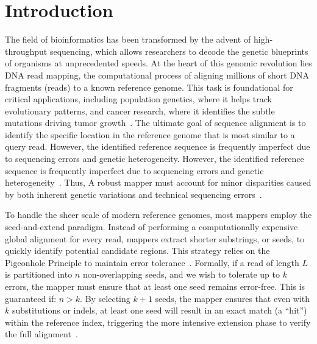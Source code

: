 \documentclass[unnumsec,webpdf,contemporary,large]{oup-authoring-template}%
\theoremstyle{thmstyleone}%
\theoremstyle{thmstyletwo}%
\theoremstyle{thmstylethree}%
\begin{document}


\section{Introduction}

The field of bioinformatics has been transformed by the advent of high-throughput sequencing,
which allows researchers to decode the genetic blueprints of organisms at unprecedented speeds. 
At the heart of this genomic revolution lies DNA read mapping,
the computational process of aligning millions of short DNA fragments (reads) to a known reference genome.
This task is foundational for critical applications, including population genetics, where it helps track evolutionary patterns, and cancer research,
where it identifies the subtle mutations driving tumor growth~\citep{icgc2020pan, li2018minimap2, zook2020robust}.
The ultimate goal of sequence alignment is to identify the specific location in the reference genome that is most similar to a query read.
However, the identified reference sequence is frequently imperfect due to sequencing errors and genetic heterogeneity.
However, the identified reference sequence is frequently imperfect due to sequencing errors and genetic heterogeneity~\citep{li2011statistical}.
Thus, A robust mapper must account for minor disparities caused by both inherent genetic variations and technical sequencing errors~\citep{ibrahim2024bioinspired}.

To handle the sheer scale of modern reference genomes, most mappers employ the seed-and-extend paradigm.
Instead of performing a computationally expensive global alignment for every read,
mappers extract shorter substrings, or seeds, to quickly identify potential candidate regions.
This strategy relies on the Pigeonhole Principle to maintain error tolerance~\citep{navarro2001guided}.
Formally, if a read of length $L$ is partitioned into $n$ non-overlapping seeds,
and we wish to tolerate up to $k$ errors, the mapper must ensure that at least one seed remains error-free.
This is guaranteed if: $n > k$.
By selecting $k+1$ seeds, the mapper ensures that even with $k$ substitutions or indels, at least one seed will result in an exact match (a ``hit'') within the reference index,
triggering the more intensive extension phase to verify the full alignment~\citep{xin2016optimal}.
\end{document}

